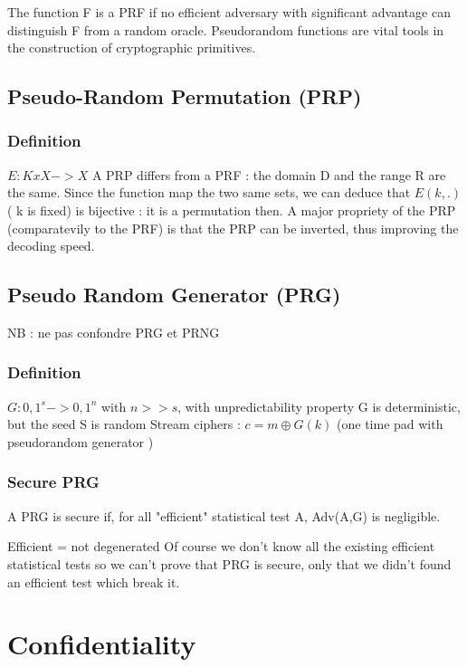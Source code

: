 The function F is a PRF if no efficient adversary with significant advantage can distinguish F from a random oracle. Pseudorandom functions are vital tools in the construction of cryptographic primitives.

\subsection{Pseudo-Random Permutation   (PRP)}


\subsubsection{Definition}

$E : KxX -> X$
A PRP differs from a PRF : the domain D and the range R are the same. Since the function map the two same sets, we can deduce that $E(k,.)$ ( k is fixed) is bijective : it is a permutation then.
A major propriety of the PRP (comparatevily to the PRF) is that the PRP can be inverted, thus improving the decoding speed.


\subsection{Pseudo Random Generator     (PRG)} 

NB : ne pas confondre PRG et PRNG

\subsubsection{Definition}

$ G : {0,1}^s -> {0,1}^n $  with  $n>>s$, with unpredictability property
G is deterministic, but the seed S is random
Stream ciphers : $c = m \oplus G(k) $  (one time pad with pseudorandom generator )


\subsubsection{Secure PRG}
A PRG is secure if, for all "efficient" statistical test A, Adv(A,G) is negligible.

Efficient = not degenerated
Of course we don't know all the existing efficient statistical tests so we can't prove that PRG is secure, only that we didn't found an efficient test which break it.


\section{Confidentiality}
